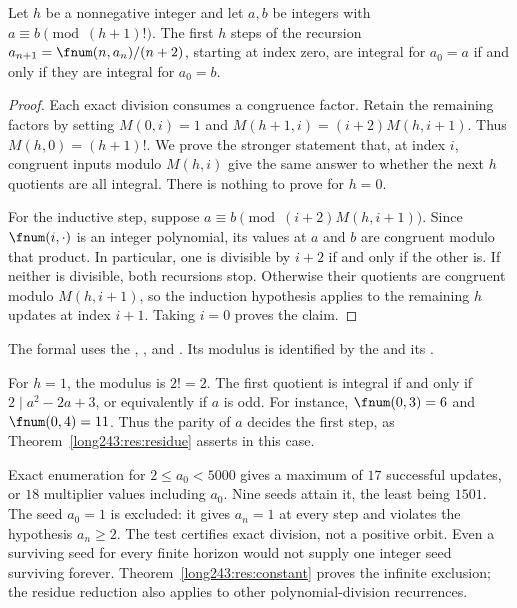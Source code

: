 \begin{theorem}\label{long243:res:residue}
Let $h$ be a nonnegative integer and let $a,b$ be integers with $a\equiv b\pmod{(h+1)!}$.
The first $h$ steps of the recursion
$a_{n+1}=\fnum(n,a_n)/(n+2)$, starting at index zero, are integral
for $a_0=a$ if and only if they are integral for $a_0=b$.
\end{theorem}

\begin{proof}
Each exact division consumes a congruence factor. Retain the remaining
factors by setting $M(0,i)=1$ and $M(h+1,i)=(i+2)M(h,i+1)$. Thus
$M(h,0)=(h+1)!$. We prove the stronger statement that, at index $i$,
congruent inputs modulo $M(h,i)$ give the same answer to whether the
next $h$ quotients are all integral.
There is nothing to prove for $h=0$.

For the inductive step, suppose
$a\equiv b\pmod{(i+2)M(h,i+1)}$. Since $\fnum(i,\cdot)$ is an integer
polynomial, its values at $a$ and $b$ are congruent modulo that product.
In particular, one is divisible by $i+2$ if and only if the other is.
If neither is divisible, both recursions stop. Otherwise their quotients
are congruent modulo $M(h,i+1)$, so the induction hypothesis applies
to the remaining $h$ updates at index $i+1$. Taking $i=0$ proves the claim.
\end{proof}

\noindent The formal
 uses the
,
, and
. Its modulus is identified by the
 and its
.

For $h=1$, the modulus is $2!=2$. The first quotient is integral
if and only if $2\mid a^2-2a+3$, or equivalently if $a$ is odd.
For instance, $\fnum(0,3)=6$ and $\fnum(0,4)=11$. Thus the parity
of $a$ decides the first step, as Theorem~\ref{long243:res:residue}
asserts in this case.

Exact enumeration for $2\le a_0<5000$ gives a maximum of $17$
successful updates, or $18$ multiplier values including $a_0$.
Nine seeds attain it, the least being $1501$. The seed $a_0=1$ is excluded:
it gives $a_n=1$ at every step and violates the hypothesis $a_n\ge2$.
The test certifies exact division, not a positive orbit. Even a
surviving seed for every finite horizon would not supply one integer
seed surviving forever. Theorem~\ref{long243:res:constant} proves the
infinite exclusion; the residue reduction also applies to other
polynomial-division recurrences.

